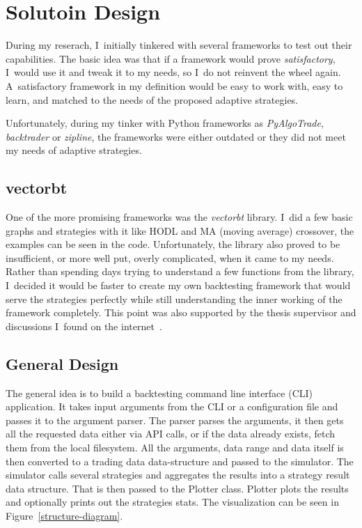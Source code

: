 \section{Solutoin Design}
During my reserach, I~initially tinkered with several frameworks to test out their capabilities. The basic idea was that if a framework would prove \emph{satisfactory}, I~would use it and tweak it to my needs, so I~do not reinvent the wheel again. A~satisfactory framework in my definition would be easy to work with, easy to learn, and matched to the needs of the proposed adaptive strategies.

Unfortunately, during my tinker with Python frameworks as \emph{PyAlgoTrade}, \emph{backtrader} or \emph{zipline}, the frameworks were either outdated or they did not meet my needs of adaptive strategies.

\subsection*{vectorbt}
One of the more promising frameworks was the \emph{vectorbt} library. I~did a few basic graphs and strategies with it like HODL and MA (moving average) crossover, the examples can be seen in the code. Unfortunately, the library also proved to be insufficient, or more well put, overly complicated, when it came to my needs. Rather than spending days trying to understand a few functions from the library, I~decided it would be faster to create my own backtesting framework that would serve the strategies perfectly while still understanding the inner working of the framework completely. This point was also supported by the thesis supervisor and discussions I~found on the internet~\cite{reddit:custom-backtester}.

\subsection*{General Design}
The general idea is to build a backtesting command line interface (CLI) application. It takes input arguments from the CLI or a configuration file and passes it to the argument parser. The parser parses the arguments, it then gets all the requested data either via API calls, or if the data already exists, fetch them from the local filesystem. All the arguments, data range and data itself is then converted to a trading data data-structure and passed to the simulator. The simulator calls several strategies and aggregates the results into a strategy result data structure. That is then passed to the Plotter class. Plotter plots the results and optionally prints out the strategies stats. The visualization can be seen in Figure~\ref{structure-diagram}.

